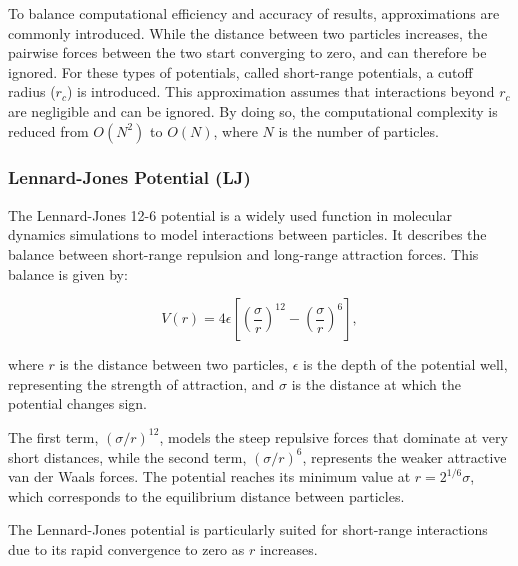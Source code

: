 To balance computational efficiency and accuracy of results, approximations are commonly introduced. While the distance between two particles increases, the pairwise forces between the two start converging to zero, and can therefore be ignored. For these types of potentials, called short-range potentials, a cutoff radius (\(r_c\)) is introduced. This approximation assumes that interactions beyond \(r_c\) are negligible and can be ignored. By doing so, the computational complexity is reduced from \(O(N^2)\) to \(O(N)\), where \(N\) is the number of particles. \parencite{gratl2022n}


\subsubsection{Lennard-Jones Potential (LJ)}

The Lennard-Jones 12-6 potential is a widely used function in molecular dynamics simulations to model interactions between particles. It describes the balance between short-range repulsion and long-range attraction forces. This balance is given by:

\[
V(r) = 4\epsilon \left[ \left(\frac{\sigma}{r}\right)^{12} - \left(\frac{\sigma}{r}\right)^{6} \right],
\]

where \(r\) is the distance between two particles, \(\epsilon\) is the depth of the potential well, representing the strength of attraction, and \(\sigma\) is the distance at which the potential changes sign. \parencite{wang2020lennard}

The first term, \((\sigma/r)^{12}\), models the steep repulsive forces that dominate at very short distances, while the second term, \((\sigma/r)^{6}\), represents the weaker attractive van der Waals forces. The potential reaches its minimum value at \(r = 2^{1/6} \sigma\), which corresponds to the equilibrium distance between particles.

The Lennard-Jones potential is particularly suited for short-range interactions due to its rapid convergence to zero as \(r\) increases. \parencite{jones1924determination}



